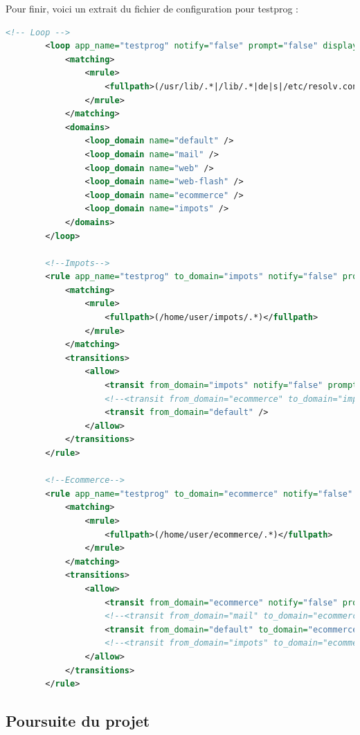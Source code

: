 \documentclass[pdftex,a4paper,titlepage,11pt]{article}
\begin{document}
Pour finir, voici un extrait du fichier de configuration pour testprog :

\begin{lstlisting}[language=XML]
		<!-- Loop -->
		<loop app_name="testprog" notify="false" prompt="false" display_name="Loop">
			<matching>
				<mrule>
					<fullpath>(/usr/lib/.*|/lib/.*|de|s|/etc/resolv.conf|/etc/nsswitch.conf|/etc/host.conf|/etc/hosts)</fullpath>
				</mrule>
			</matching>
			<domains>
				<loop_domain name="default" />
				<loop_domain name="mail" />
				<loop_domain name="web" />
				<loop_domain name="web-flash" />
				<loop_domain name="ecommerce" />
				<loop_domain name="impots" />
			</domains>
		</loop>

		<!--Impots-->
		<rule app_name="testprog" to_domain="impots" notify="false" prompt="true" display_name="domaine impots">
			<matching>
				<mrule>
					<fullpath>(/home/user/impots/.*)</fullpath>
				</mrule>
			</matching>
			<transitions>
				<allow>
					<transit from_domain="impots" notify="false" prompt="false"/>
					<!--<transit from_domain="ecommerce" to_domain="impots" notify="false" prompt="true"/>-->
					<transit from_domain="default" />
				</allow>
			</transitions>
		</rule>

		<!--Ecommerce-->
		<rule app_name="testprog" to_domain="ecommerce" notify="false" prompt="true" display_name="domaine ecommerce">
			<matching>
				<mrule>
					<fullpath>(/home/user/ecommerce/.*)</fullpath>
				</mrule>
			</matching>
			<transitions>
				<allow>
					<transit from_domain="ecommerce" notify="false" prompt="false"/>
					<!--<transit from_domain="mail" to_domain="ecommerce" prompt="true" />-->
					<transit from_domain="default" to_domain="ecommerce" prompt="true" />
					<!--<transit from_domain="impots" to_domain="ecommerce" prompt="true" />-->
				</allow>
			</transitions>
		</rule>
\end{lstlisting}

\subsection{Poursuite du projet}
\end{document}
